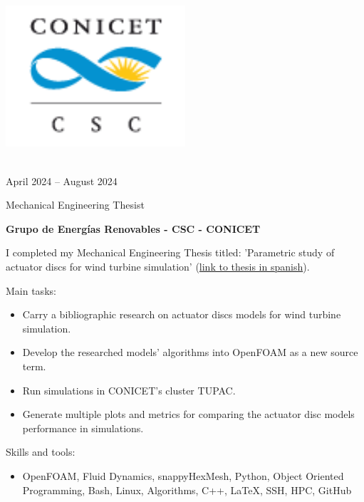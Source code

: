 \documentclass[a4paper,10pt]{article}
\newlength{\cvcolumngapwidth}
\newlength{\cvleftcolumnwidth}
\newlength{\cvrightcolumnwidth}
\newcommand{\cvtitlestyle}[1]{{\large\cvtitlefont\textcolor{cvtitlecolor}{#1}}}
\newcommand{\cvdurationstyle}[1]{{\small\cvdurationfont\textcolor{cvdurationcolor}{#1}}}
\newlength{\cvafteritemskipamount}
\newlength{\cvaftertitleskipamount}
\newlength{\cvparskip}
\newcommand{\cvitem}[2]{
    \begin{minipage}[t]{\cvleftcolumnwidth}
        \raggedleft #1
    \end{minipage}%
    \hspace{\cvcolumngapwidth}%
    \begin{minipage}[t]{\cvrightcolumnwidth}
        \setlength{\parskip}{\cvparskip} #2
    \end{minipage}

    \vspace{\cvafteritemskipamount}
}
\newcommand{\cvtitle}[1]{
    \cvtitlestyle{#1}

    \vspace{\cvaftertitleskipamount}
    \vspace{-\cvparskip}
}
\begin{document}
\cvitem{
	\begin{minipage}{\textwidth}
    \begin{flushright}
		  \includegraphics[width=0.5\textwidth]{../logos-photos/Logo_CSC.png}   
    \end{flushright}  
  \end{minipage} \\
  \vspace{0.3cm}
  \cvdurationstyle{April 2024 -- August 2024}\\
}{
	
  \cvtitle{Mechanical Engineering Thesist}
  \textbf{\large Grupo de Energías Renovables - CSC - CONICET}

  I completed my Mechanical Engineering Thesis titled: 'Parametric study of actuator discs for wind turbine simulation'
  (\href{https://drive.google.com/file/d/1TWklGPKCdaIwJHuOc-fqAFvFS9hN7_sT/view?usp=sharing}{link to thesis in spanish}).

  Main tasks:
  \begin{itemize}
    \item Carry a bibliographic research on actuator discs models for wind turbine simulation.
    \item Develop the researched models' algorithms into OpenFOAM as a new source term.
    \item Run simulations in CONICET's cluster TUPAC.
    \item Generate multiple plots and metrics for comparing the actuator disc models performance in simulations.
  \end{itemize}

  Skills and tools:
  \begin{itemize}
    \item OpenFOAM, Fluid Dynamics, snappyHexMesh, Python, Object Oriented Programming, Bash, Linux, Algorithms,
        C++, LaTeX, SSH, HPC, GitHub
  \end{itemize}
  
}
\end{document}

